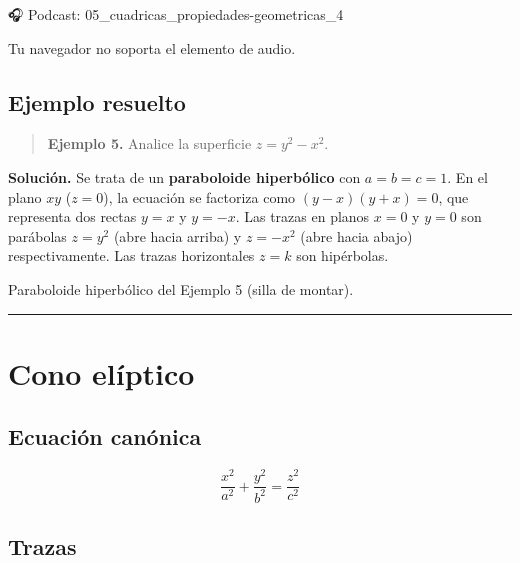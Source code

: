 \documentclass[
]{book}
\begin{document}
🎧 Podcast: 05\_cuadricas\_propiedades-geometricas\_4

Tu navegador no soporta el elemento de audio.

\subsection{Ejemplo resuelto}\label{ejemplo-resuelto-20}

\begin{quote}
\textbf{Ejemplo 5.} Analice la superficie \(z = y^2 - x^2\).
\end{quote}

\textbf{Solución.} Se trata de un \textbf{paraboloide hiperbólico} con \(a = b = c = 1\). En el plano \(xy\) (\(z = 0\)), la ecuación se factoriza como \((y - x)(y + x) = 0\), que representa dos rectas \(y = x\) y \(y = -x\). Las trazas en planos \(x = 0\) y \(y = 0\) son parábolas \(z = y^2\) (abre hacia arriba) y \(z = -x^2\) (abre hacia abajo) respectivamente. Las trazas horizontales \(z = k\) son hipérbolas.

\label{fig:paraboloide-hiperbolico-ejemplo}Paraboloide hiperbólico del Ejemplo 5 (silla de montar).

\begin{center}\rule{0.5\linewidth}{0.5pt}\end{center}

\section{Cono elíptico}\label{cono-eluxedptico}

\subsection{Ecuación canónica}\label{ecuaciuxf3n-canuxf3nica-5}

\[
\frac{x^2}{a^2} + \frac{y^2}{b^2} = \frac{z^2}{c^2}
\]

\subsection{Trazas}\label{trazas-5}
\end{document}
